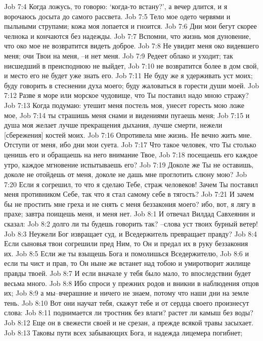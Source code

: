 Job 7:4  Когда ложусь, то говорю: `когда-то встану?', а вечер длится, и я ворочаюсь досыта до самого рассвета.
Job 7:5  Тело мое одето червями и пыльными струпами; кожа моя лопается и гноится.
Job 7:6  Дни мои бегут скорее челнока и кончаются без надежды.
Job 7:7  Вспомни, что жизнь моя дуновение, что око мое не возвратится видеть доброе.
Job 7:8  Не увидит меня око видевшего меня; очи Твои на меня, --и нет меня.
Job 7:9  Редеет облако и уходит; так нисшедший в преисподнюю не выйдет,
Job 7:10  не возвратится более в дом свой, и место его не будет уже знать его.
Job 7:11  Не буду же я удерживать уст моих; буду говорить в стеснении духа моего; буду жаловаться в горести души моей.
Job 7:12  Разве я море или морское чудовище, что Ты поставил надо мною стражу?
Job 7:13  Когда подумаю: утешит меня постель моя, унесет горесть мою ложе мое,
Job 7:14  ты страшишь меня снами и видениями пугаешь меня;
Job 7:15  и душа моя желает лучше прекращения дыхания, лучше смерти, нежели [сбережения] костей моих.
Job 7:16  Опротивела мне жизнь. Не вечно жить мне. Отступи от меня, ибо дни мои суета.
Job 7:17  Что такое человек, что Ты столько ценишь его и обращаешь на него внимание Твое,
Job 7:18  посещаешь его каждое утро, каждое мгновение испытываешь его?
Job 7:19  Доколе же Ты не оставишь, доколе не отойдешь от меня, доколе не дашь мне проглотить слюну мою?
Job 7:20  Если я согрешил, то что я сделаю Тебе, страж человеков! Зачем Ты поставил меня противником Себе, так что я стал самому себе в тягость?
Job 7:21  И зачем бы не простить мне греха и не снять с меня беззакония моего? ибо, вот, я лягу в прахе; завтра поищешь меня, и меня нет.
Job 8:1  И отвечал Вилдад Савхеянин и сказал:
Job 8:2  долго ли ты будешь говорить так? --слова уст твоих бурный ветер!
Job 8:3  Неужели Бог извращает суд, и Вседержитель превращает правду?
Job 8:4  Если сыновья твои согрешили пред Ним, то Он и предал их в руку беззакония их.
Job 8:5  Если же ты взыщешь Бога и помолишься Вседержителю,
Job 8:6  и если ты чист и прав, то Он ныне же встанет над тобою и умиротворит жилище правды твоей.
Job 8:7  И если вначале у тебя было мало, то впоследствии будет весьма много.
Job 8:8  Ибо спроси у прежних родов и вникни в наблюдения отцов их;
Job 8:9  а мы--вчерашние и ничего не знаем, потому что наши дни на земле тень.
Job 8:10  Вот они научат тебя, скажут тебе и от сердца своего произнесут слова:
Job 8:11  поднимается ли тростник без влаги? растет ли камыш без воды?
Job 8:12  Еще он в свежести своей и не срезан, а прежде всякой травы засыхает.
Job 8:13  Таковы пути всех забывающих Бога, и надежда лицемера погибнет;
